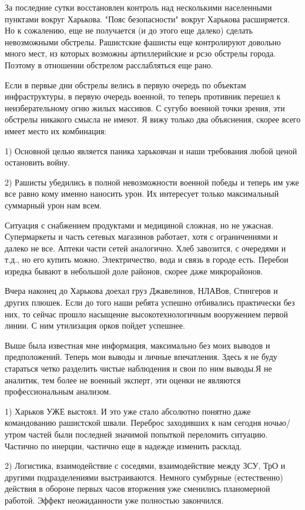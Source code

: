За последние сутки восстановлен контроль над несколькими населенными пунктами
вокруг Харькова. "Пояс безопасности" вокруг Харькова расширяется. Но к
сожалению, еще не получается (и до этого еще далеко) сделать невозможными
обстрелы. Рашистские фашисты еще контролируют довольно много мест, из которых
возможны артиллерийские и рсзо обстрелы города. Поэтому в отношении обстрелом
расслабляться еще рано. 

Если в первые дни обстрелы велись в первую очередь по объектам инфраструктуры,
в первую очередь военной, то теперь противник перешел к неизберательному огню
жилых массивов. С сугубо военной точки зрения, эти обстрелы никакого смысла не
имеют. Я вижу только два объяснения, скорее всего имеет место их комбинация:

1) Основной целью является паника харьковчан и наши требования любой ценой остановить войну. 

2) Рашисты убедились в полной невозможности военной победы и теперь им уже все
равно кому именно наносить урон. Их интересует только максимальный суммарный
урон нам всем. 

Ситуация с снабжением продуктами и медициной сложная, но не ужасная.
Супермаркеты и часть сетевых магазинов работает, хотя с ограничениями и далеко
не все. Аптеки части сетей аналогично. Хлеб завозится, с очередями и т.д., но
его купить можно. Электричество, вода и связь в городе есть. Перебои изредка
бывают в небольшой доле районов, скорее даже микрорайонов. 

Вчера наконец до Харькова доехал груз Джавелинов, НЛАВов, Стингеров и других
плюшек. Если до того наши ребята успешно отбивались практически без них, то
сейчас прошло насыщение высокотехнологичным вооружением первой линии. С ним
утилизация орков пойдет успешнее.

Выше была известная мне информация, максимально без моих выводов и
предположений. Теперь мои выводы и личные впечатления. Здесь я не буду
стараться четко разделить чистые наблюдения и свои по ним выводы.Я не аналитик,
тем более не военный эксперт, эти оценки не являются профессиональным анализом. 

1) Харьков УЖЕ выстоял. И это уже стало абсолютно понятно даже командованию
рашистской швали. Переброс заходивших к нам сегодня ночью/утром частей были
последней значимой попыткой переломить ситуацию. Частично по инерции, частично
еще в надежде изменить расклад. 

2) Логистика, взаимодействие с соседями, взаимодействие между ЗСУ, ТрО и
другими подразделениями выстраиваются. Немного сумбурные (естественно) действия
в обороне первых часов вторжения уже сменились планомерной работой. Эффект
неожиданности уже полностью закончился. 

